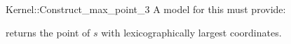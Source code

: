 \begin{ccRefFunctionObjectConcept}{Kernel::Construct_max_point_3}
A model for this must provide:


       {returns the point of $s$ with lexicographically largest coordinates.}

\end{ccRefFunctionObjectConcept}
